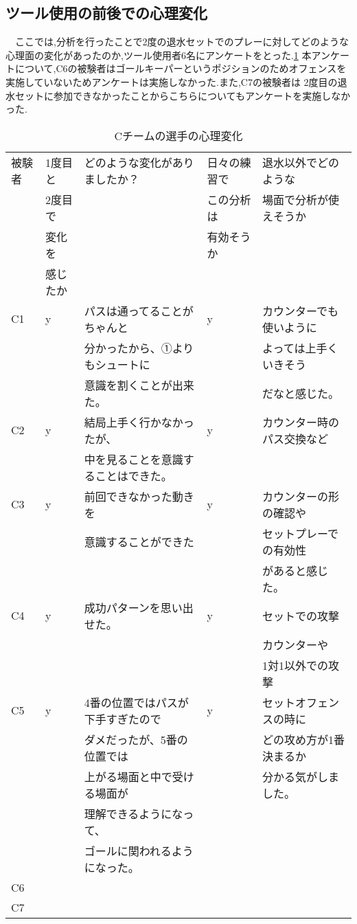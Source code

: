 \documentclass[../main.tex]{subfiles}
\begin{document}
    \subsection{ツール使用の前後での心理変化}
    \par　ここでは,分析を行ったことで2度の退水セットでのプレーに対してどのような心理面の変化があったのか,ツール使用者6名にアンケートをとった.\ref{table:高校生チームの心理変化}
    本アンケートについて,C6の被験者はゴールキーパーというポジションのためオフェンスを実施していないためアンケートは実施しなかった.また,C7の被験者は
    2度目の退水セットに参加できなかったことからこちらについてもアンケートを実施しなかった.
    
    
    \begin{table}[h]
      \caption{Cチームの選手の心理変化}\label{table:高校生チームの心理変化}
      \begin{tabular}{lllll}
        \hline\hline
      被験者 & 1度目と & どのような変化がありましたか？ & 日々の練習で & 退水以外でどのような\\
      & 2度目で & & この分析は & 場面で分析が使えそうか \\
      & 変化を & &有効そうか& \\
      &感じたか&&&\\
      \hline\hline
      C1 & y & パスは通ってることがちゃんと& y & カウンターでも使いように \\
      &&分かったから、①よりもシュートに&&よっては上手くいきそう\\
      &&意識を割くことが出来た。&&だなと感じた。\\
      C2 & y & 結局上手く行かなかったが、 & y & カウンター時のパス交換など \\
      &&中を見ることを意識することはできた。&&\\
      C3 & y & 前回できなかった動きを& y & カウンターの形の確認や \\
      &&意識することができた &&セットプレーでの有効性\\
      &&&&があると感じた。\\
      C4 & y & 成功パターンを思い出せた。 & y & セットでの攻撃 \\
      &&&&カウンターや\\
      &&&&1対1以外での攻撃\\
      C5 & y & 4番の位置ではパスが下手すぎたので& y & セットオフェンスの時に\\
      &&ダメだったが、5番の位置では&&どの攻め方が1番決まるか\\
      &&上がる場面と中で受ける場面が&&分かる気がしました。 \\
      &&理解できるようになって、 &\\
      &&ゴールに関われるようになった。&\\
      C6 & & & \\
      C7 & & & & \\
      \hline
      \end{tabular}
      \end{table}
\end{document}
